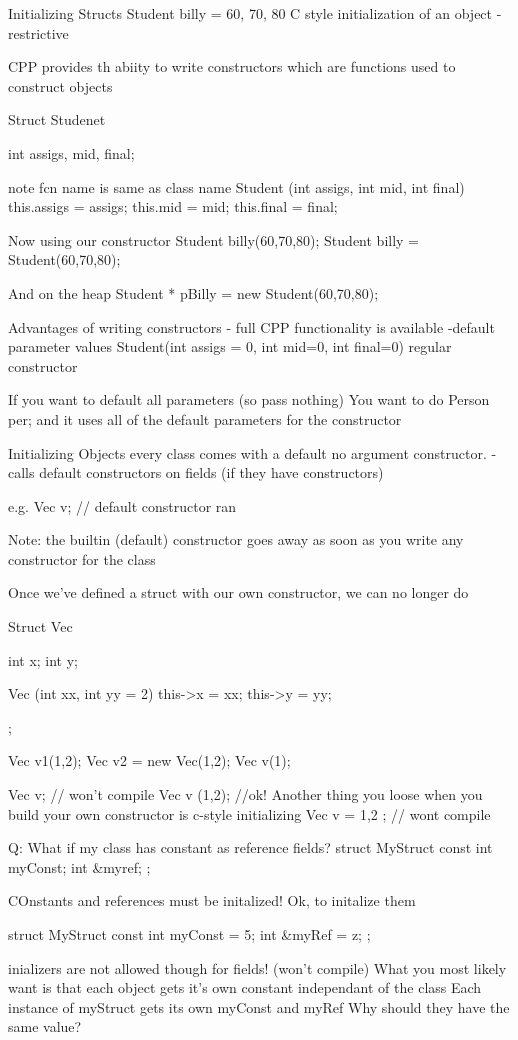 \documentclass[12pt,oneside,fleqn]{book}
\begin{document}
{{Initializing Structs
Student billy = { 60, 70, 80}
C style initialization of an object
- restrictive

CPP provides th abiity to write constructors which are functions used to construct objects

Struct Studenet {
	int assigs, mid, final;

	note fcn name is same as class name
	Student (int assigs, int mid, int final) {
	this.assigs = assigs;
	this.mid = mid;
	this.final = final;
	}
}

Now using our constructor
Student billy(60,70,80); 
Student billy = Student(60,70,80);

And on the heap
Student * pBilly = new Student(60,70,80);

Advantages of writing constructors
- full CPP functionality is available
-default parameter values
Student(int assigs = 0, int mid=0, int final=0) {
	regular constructor
}


If you want to default all parameters (so pass nothing)
You want to do
Person per;
and it uses all of the default parameters for the constructor


Initializing Objects
every class comes with a default no argument constructor.
- calls default constructors on fields (if they have constructors)

e.g.
Vec v; // default constructor ran

Note: the builtin (default) constructor goes away as soon as you write any constructor for the class

Once we've defined a struct with our own constructor, we can no longer do


Struct Vec {
	int x;
	int y;
	
	Vec (int xx, int yy = 2) {
		this->x = xx;
		this->y = yy;
	}
};

Vec v1(1,2);
Vec v2 = new Vec(1,2);
Vec v(1);




Vec v; // won't compile
Vec v (1,2); //ok!
Another thing you loose when you build your own constructor is c-style initializing
Vec v = { 1,2} ; // wont compile

Q: What if my class has constant as reference fields?
struct MyStruct{
	const int myConst;
	int \&myref;
};

COnstants and references must be initalized!
Ok, to initalize them


struct MyStruct{
	const int myConst = 5;
	int \&myRef = z;
};


inializers are not allowed though for fields! (won't compile)
What you most likely want is that each object gets it's own constant independant of the class
Each instance of myStruct gets its own myConst and myRef
Why should they have the same value?

}}
\end{document}

